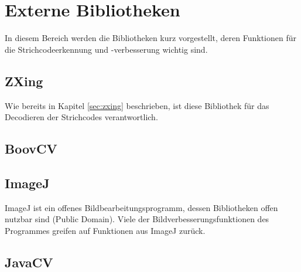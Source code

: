 \section{Externe Bibliotheken}
In diesem Bereich werden die Bibliotheken kurz vorgestellt, deren Funktionen für die Strichcodeerkennung und -verbesserung wichtig sind.


\subsection*{ZXing}
Wie bereits in Kapitel \ref{sec:zxing} beschrieben, ist diese Bibliothek für das Decodieren der Strichcodes verantwortlich.


\subsection*{BoovCV}



\subsection*{ImageJ}
ImageJ ist ein offenes Bildbearbeitungsprogramm, dessen Bibliotheken offen nutzbar sind (Public Domain). Viele der Bildverbesserungsfunktionen des Programmes greifen auf Funktionen aus ImageJ zurück.



\subsection*{JavaCV}
